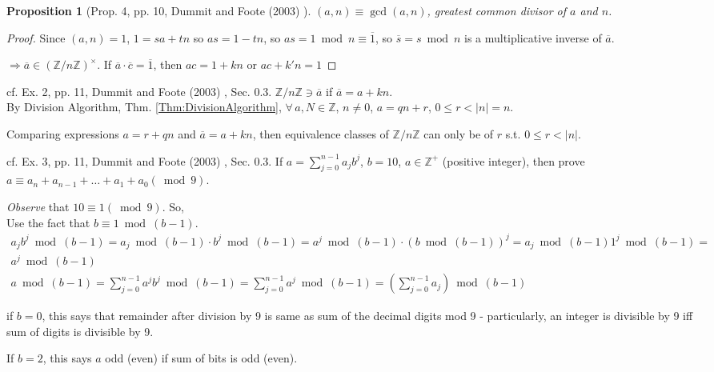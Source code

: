\documentclass[10pt]{amsart}
\newtheorem{proposition}{Proposition}
\newcommand{\exercisehead}[1]
  { \smallskip
   \noindent{\small\bf Exercise #1.}
  }
\begin{document}
\begin{multicols*}{2}
\begin{proposition}[Prop. 4, pp. 10, Dummit and Foote (2003) \cite{DuFo2003}]
$(a,n) \equiv \gcd{(a,n)}$, greatest common divisor of $a$ and $n$. 
\end{proposition}

\begin{proof}
	Since $(a,n) = 1$, $1= sa + tn$ so $as = 1 - tn$, so $as = 1 \bmod{n} \equiv \overline{1}$, so $\overline{s} = s\bmod{n}$ is a multiplicative inverse of $\overline{a}$.
	
	$\Longrightarrow \overline{a} \in (\mathbb{Z} / n\mathbb{Z})^{\times}$.  If $\overline{a} \cdot \overline{c} = \overline{1}$, then $ac= 1 + kn$ or $ac+ k' n=1$
	
\end{proof}

\exercisehead{2} cf. Ex. 2, pp. 11, Dummit and Foote (2003) \cite{DuFo2003}, Sec. 0.3. $\mathbb{Z} / n \mathbb{Z} \ni \overline{a}$ if $\overline{a} = a + kn$. \\
By Division Algorithm, Thm. \ref{Thm:DivisionAlgorithm}, $\forall \, a, N \in \mathbb{Z}$, $n\neq 0$, $a=qn + r$, $0\leq r < |n| = n$.

Comparing expressions $a=  r + qn$ and $\overline{a} = a + kn$, then equivalence classes of $\mathbb{Z}/n\mathbb{Z}$ can only be of $r$ s.t. $0\leq r < |n|$.

\exercisehead{3} cf. Ex. 3, pp. 11, Dummit and Foote (2003) \cite{DuFo2003}, Sec. 0.3. If $a= \sum_{j=0}^{n-1} a_j b^j$, $b=10$, $a\in \mathbb{Z}^+$ (positive integer), then prove $a \equiv a_n + a_{n-1} + \dots + a_1 + a_0 (\bmod{9})$. 

\emph{Observe} that $10 \equiv 1 (\bmod{9})$. So, \\

Use the fact that $b\equiv 1 \bmod{(b-1)}$.
\[
\begin{gathered}
	a_j b^j \bmod{(b-1)} = a_j \bmod{(b-1)} \cdot b^j \bmod{(b-1)} = a^j \bmod{(b-1)} \cdot (b \bmod{(b-1)})^j = a_j \bmod{(b-1)} 1^j \bmod{(b-1)} = \\
	a^j \bmod{(b-1)} \\
	a \bmod{(b-1)} = \sum_{j=0}^{n-1} a^jb^j \bmod{(b-1)} = \sum_{j=0}^{n-1} a^j \bmod{(b-1)} = \left( \sum_{j=0}^{n-1} a_j \right) \bmod{(b-1)}
\end{gathered}
\]

if $b=0$, this says that remainder after division by 9 is same as sum of the decimal digits mod 9 - particularly, an integer is divisible by 9 iff sum of digits is divisible by 9.

If $b=2$, this says $a$ odd (even) if sum of bits is odd (even).


\end{multicols*}
\end{document}
